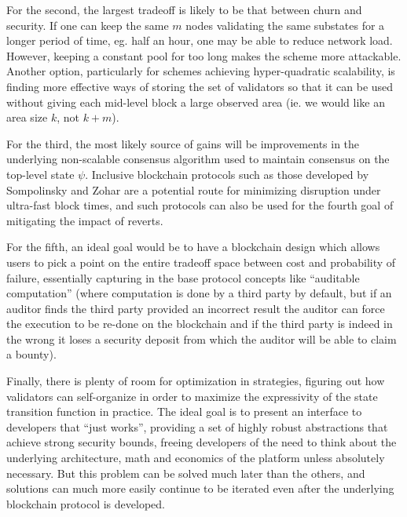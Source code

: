 \documentclass[11pt,a4paper]{report}
\theoremstyle{plain}
\theoremstyle{definition}
\theoremstyle{remark}
\begin{document}
For the second, the largest tradeoff is likely to be that between churn and security. If one can keep the same $m$ nodes validating the same substates for a longer period of time, eg. half an hour, one may be able to reduce network load. However, keeping a constant pool for too long makes the scheme more attackable. Another option, particularly for schemes achieving hyper-quadratic scalability, is finding more effective ways of storing the set of validators so that it can be used without giving each mid-level block a large observed area (ie. we would like an area size $k$, not $k + m$).

For the third, the most likely source of gains will be improvements in the underlying non-scalable consensus algorithm used to maintain consensus on the top-level state $\psi$. Inclusive blockchain protocols such as those developed by Sompolinsky and Zohar \cite{inclusive} are a potential route for minimizing disruption under ultra-fast block times, and such protocols can also be used for the fourth goal of mitigating the impact of reverts.

For the fifth, an ideal goal would be to have a blockchain design which allows users to pick a point on the entire tradeoff space between cost and probability of failure, essentially capturing in the base protocol concepts like ``auditable computation'' \cite{auditable} (where computation is done by a third party by default, but if an auditor finds the third party provided an incorrect result the auditor can force the execution to be re-done on the blockchain and if the third party is indeed in the wrong it loses a security deposit from which the auditor will be able to claim a bounty).

Finally, there is plenty of room for optimization in strategies, figuring out how validators can self-organize in order to maximize the expressivity of the state transition function in practice. The ideal goal is to present an interface to developers that ``just works'', providing a set of highly robust abstractions that achieve strong security bounds, freeing developers of the need to think about the underlying architecture, math and economics of the platform unless absolutely necessary. But this problem can be solved much later than the others, and solutions can much more easily continue to be iterated even after the underlying blockchain protocol is developed.
\end{document}
